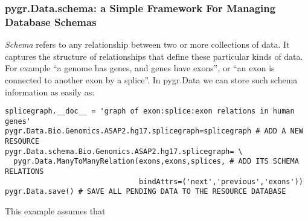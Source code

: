 \documentclass{howto}
\begin{document}
\subsubsection{pygr.Data.schema: a Simple Framework For Managing Database Schemas}
{\em Schema} refers to any relationship between two or more collections of
data.  It captures the structure of relationships that define these particular
kinds of data.  For example ``a genome has genes, and genes have exons'', or 
``an exon is connected to another exon by a splice''.  In pygr.Data we can
store such schema information as easily as:
\begin{verbatim}
splicegraph.__doc__ = 'graph of exon:splice:exon relations in human genes'
pygr.Data.Bio.Genomics.ASAP2.hg17.splicegraph=splicegraph # ADD A NEW RESOURCE
pygr.Data.schema.Bio.Genomics.ASAP2.hg17.splicegraph= \
  pygr.Data.ManyToManyRelation(exons,exons,splices, # ADD ITS SCHEMA RELATIONS
                               bindAttrs=('next','previous','exons'))
pygr.Data.save() # SAVE ALL PENDING DATA TO THE RESOURCE DATABASE
\end{verbatim}
This example assumes that 
\end{document}
